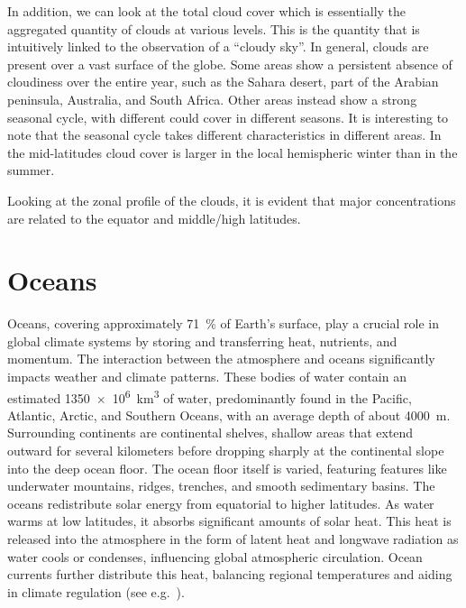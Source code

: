 In addition, we can look at the total cloud cover which is essentially the aggregated quantity of clouds at various levels. This is the quantity that is intuitively linked to the observation of a “cloudy sky”. In general, clouds are present over a vast surface of the globe. Some areas show a persistent absence of cloudiness over the entire year, such as the Sahara desert, part of the Arabian peninsula, Australia, and South Africa. Other areas instead show a strong seasonal cycle, with different could cover in different seasons. It is interesting to note that the seasonal cycle takes different characteristics in different areas. In the mid-latitudes cloud cover is larger in the local hemispheric winter than in the summer.

Looking at the zonal profile of the clouds, it is evident that major concentrations are related to the equator and middle/high latitudes.



\section{Oceans}
Oceans, covering approximately \qty{71}{\percent} of Earth's surface, play a crucial role in global climate systems by storing and transferring heat, nutrients, and momentum. The interaction between the atmosphere and oceans significantly impacts weather and climate patterns. These bodies of water contain an estimated \qty{1350e6}{\kilo\meter\cubed} of water, predominantly found in the Pacific, Atlantic, Arctic, and Southern Oceans, with an average depth of about \qty{4000}{\meter}.
\newline Surrounding continents are continental shelves, shallow areas that extend outward for several kilometers before dropping sharply at the continental slope into the deep ocean floor. The ocean floor itself is varied, featuring features like underwater mountains, ridges, trenches, and smooth sedimentary basins.
\newline The oceans redistribute solar energy from equatorial to higher latitudes. As water warms at low latitudes, it absorbs significant amounts of solar heat. This heat is released into the atmosphere in the form of latent heat and longwave radiation as water cools or condenses, influencing global atmospheric circulation. Ocean currents further distribute this heat, balancing regional temperatures and aiding in climate regulation (see e.g.~\secref{\ref{subsec:ocean-influence}}).

